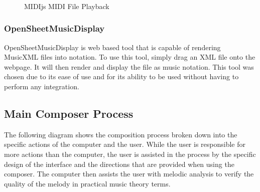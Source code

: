 \begin{figure}[!htbp]
	\caption{MIDIjs MIDI File Playback \cite{MIDIjs_ND}}
	 \\
	 \\
	 \\
\end{figure}

\subsubsection{OpenSheetMusicDisplay}
\label{subsubsec:opensheetmusicdisplay}

OpenSheetMusicDisplay is web based tool that is capable of rendering MusicXML files into notation.  To use this tool, simply drag an XML file onto the webpage.  It will then render and display the file as music notation.  This tool was chosen due to its ease of use and for its ability to be used without having to perform any integration.

\subsection{Main Composer Process}
\label{subsec:maincomposerprocess}

The following diagram shows the composition process broken down into the specific actions of the computer and the user.  While the user is responsible for more actions than the computer, the user is assisted in the process by the specific design of the interface and the directions that are provided when using the composer.  The computer then assists the user with melodic analysis to verify the quality of the melody in practical music theory terms.

